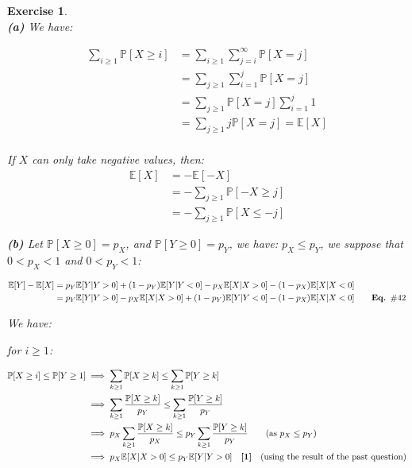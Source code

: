\documentclass{article}
\newtheorem{exo}{Exercise}
\def\P{\mathbb{P}}
\def\E{\mathbb{E}}
\begin{document}
\begin{exo}{\ \\}
\noindent    
\textbf{(a)} We have:

\begin{align*}
    \sum_{i\geq1} \P[X \geq i]
    &= \sum_{i\geq1} \sum_{j = i }^{\infty} \P[X=j] \\
    &= \sum_{j\geq1} \sum_{i=1}^{j} \P[X=j] \\
    &= \sum_{j\geq1} \P[X=j]\sum_{i=1}^{j}1  \\
    &= \sum_{j\geq1} j \P[X=j] = \E[X]\\
\end{align*}

If $X$ can only take negative values, then: 
\begin{align*}
    \E[X] 
    &= -\E[-X] \\
    &= -\sum_{j \geq 1} \P[-X \geq j] \\
    &= -\sum_{j \geq 1} \P[X \leq -j]
\end{align*}



\noindent    
\textbf{(b)} Let $\P[X\geq0] = p_X$, and $\P[Y\geq0] = p_Y$, we have: $p_X \leq p_Y$, we suppose that $0 < p_X < 1$ and $ 0 <  p_Y < 1$:

\begin{align*}
    \E[Y]-\E[X] 
    &= p_Y \E[Y|Y>0] + (1-p_Y)\E[Y|Y<0] -
    p_X \E[X|X>0] - (1-p_X)\E[X|X<0] \\
    &= p_Y \E[Y|Y>0] - p_X \E[X|X>0] 
    +(1-p_Y)\E[Y|Y<0] -  (1-p_X)\E[X|X<0] 
    \quad \quad \text{\textbf{Eq. $\#42$}}
\end{align*}

We have:


for $i \geq 1$:

\begin{align*}
    \P[X\geq i] \leq \P[Y \geq 1] 
    &\implies \sum_{k \geq 1} \P[X\geq k] \leq \sum_{k \geq 1} \P[Y \geq k]\\
    &\implies \sum_{k \geq 1} \frac{\P[X\geq k]}{p_Y}
    \leq \sum_{k \geq 1} \frac{\P[Y \geq k]}{p_Y}\\
    &\implies p_X \sum_{k \geq 1}  \frac{\P[X\geq k]}{p_X}
    \leq  p_Y \sum_{k \geq 1} \frac{\P[Y \geq k]}{p_Y} 
    \quad \quad \text{(as $p_X \leq p_Y$)}\\
    &\implies  p_X \E[X | X>0] \leq p_Y \E[Y | Y>0]
    \quad \text{\textbf{[1]}} \quad \text{(using the result of the past question)}  \\
\end{align*}


\end{exo}
\end{document}
